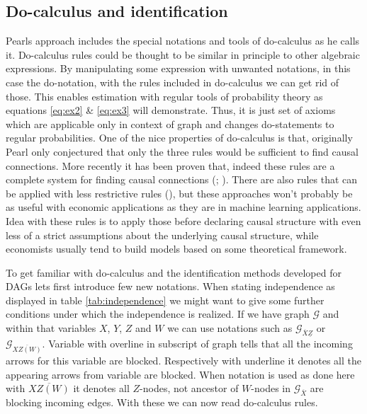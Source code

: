 \documentclass[main=english,12pt,a4paper,pdftex,econ,utf8]{aaltothesis}
\newcommand{\g}{\mathcal{G}}
\begin{document}


\subsection{Do-calculus and identification}

Pearls approach includes the special notations and tools of do-calculus as he calls it. Do-calculus rules could be thought to be similar in principle to other algebraic expressions. By manipulating some expression with unwanted notations, in this case the do-notation, with the rules included in do-calculus we can get rid of those. This enables estimation with regular tools of probability theory as equations \ref{eq:ex2} \& \ref{eq:ex3} will demonstrate. Thus, it is just set of axioms which are applicable only in context of graph and changes do-statements to regular probabilities. One of the nice properties of do-calculus is that, originally Pearl only conjectured that only the three rules would be sufficient to find causal connections. More recently it has been proven that, indeed these rules are a complete system for finding causal connections (\cite{Shpitser2006}; \cite{Huang2006a}). There are also rules that can be applied with less restrictive rules (\cite{Hyttinen2015}), but these approaches won't probably be as useful with economic applications as they are in machine learning applications. Idea with these rules is to apply those before declaring causal structure with even less of a strict assumptions about the underlying causal structure, while economists usually tend to build models based on some theoretical framework.

To get familiar with do-calculus and the identification methods developed for DAGs lets first introduce few new notations. When stating independence as displayed in table \ref{tab:independence} we might want to give some further conditions under which the independence is realized. If we have graph $\g$ and within that variables $X$, $Y$, $Z$ and $W$ we can use notations such as $\g_{\overline{X}\underline{Z}}$ or $\g_{\overline{XZ(W)}}$. Variable with overline in subscript of graph tells that all the incoming arrows for this variable are blocked. Respectively with underline it denotes all the appearing arrows from variable are blocked. When notation is used as done here with $\overline{XZ(W)}$ it denotes all $Z$-nodes, not ancestor of $W$-nodes in $\g_{\overline{X}}$ are blocking incoming edges. With these we can now read do-calculus rules.
\end{document}
